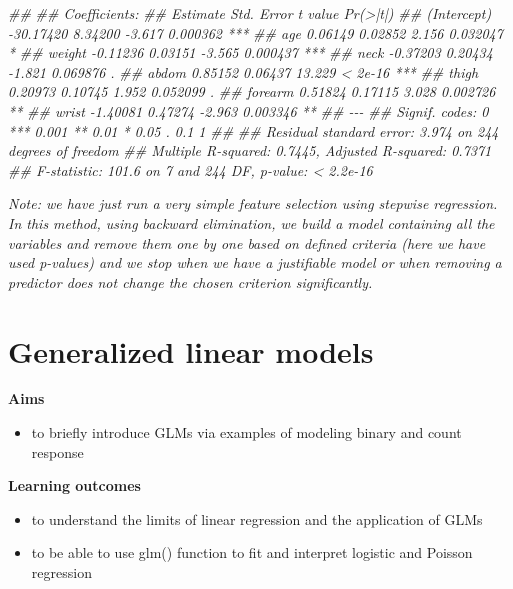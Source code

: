 \documentclass[
]{book}
\newenvironment{Shaded}{\begin{snugshade}}{\end{snugshade}}
\newcommand{\CommentTok}[1]{\textcolor[rgb]{0.56,0.35,0.01}{\textit{#1}}}
\providecommand{\tightlist}{%
  \setlength{\itemsep}{0pt}\setlength{\parskip}{0pt}}
\theoremstyle{definition}
\theoremstyle{definition}
\theoremstyle{definition}
\theoremstyle{remark}
\begin{document}
\begin{Shaded}
\begin{Highlighting}[]
\CommentTok{\#\# }
\CommentTok{\#\# Coefficients:}
\CommentTok{\#\#              Estimate Std. Error t value Pr(\textgreater{}|t|)    }
\CommentTok{\#\# (Intercept) {-}30.17420    8.34200  {-}3.617 0.000362 ***}
\CommentTok{\#\# age           0.06149    0.02852   2.156 0.032047 *  }
\CommentTok{\#\# weight       {-}0.11236    0.03151  {-}3.565 0.000437 ***}
\CommentTok{\#\# neck         {-}0.37203    0.20434  {-}1.821 0.069876 .  }
\CommentTok{\#\# abdom         0.85152    0.06437  13.229  \textless{} 2e{-}16 ***}
\CommentTok{\#\# thigh         0.20973    0.10745   1.952 0.052099 .  }
\CommentTok{\#\# forearm       0.51824    0.17115   3.028 0.002726 ** }
\CommentTok{\#\# wrist        {-}1.40081    0.47274  {-}2.963 0.003346 ** }
\CommentTok{\#\# {-}{-}{-}}
\CommentTok{\#\# Signif. codes:  0 \textquotesingle{}***\textquotesingle{} 0.001 \textquotesingle{}**\textquotesingle{} 0.01 \textquotesingle{}*\textquotesingle{} 0.05 \textquotesingle{}.\textquotesingle{} 0.1 \textquotesingle{} \textquotesingle{} 1}
\CommentTok{\#\# }
\CommentTok{\#\# Residual standard error: 3.974 on 244 degrees of freedom}
\CommentTok{\#\# Multiple R{-}squared:  0.7445,	Adjusted R{-}squared:  0.7371 }
\CommentTok{\#\# F{-}statistic: 101.6 on 7 and 244 DF,  p{-}value: \textless{} 2.2e{-}16}
\end{Highlighting}
\end{Shaded}

\emph{Note: we have just run a very simple feature selection using stepwise regression. In this method, using backward elimination, we build a model containing all the variables and remove them one by one based on defined criteria (here we have used p-values) and we stop when we have a justifiable model or when removing a predictor does not change the chosen criterion significantly.}

\hypertarget{generalized-linear-models}{%
\chapter{Generalized linear models}\label{generalized-linear-models}}

\textbf{Aims}

\begin{itemize}
\tightlist
\item
  to briefly introduce GLMs via examples of modeling binary and count response
\end{itemize}

\textbf{Learning outcomes}

\begin{itemize}
\tightlist
\item
  to understand the limits of linear regression and the application of GLMs
\item
  to be able to use glm() function to fit and interpret logistic and Poisson regression
\end{itemize}
\end{document}
